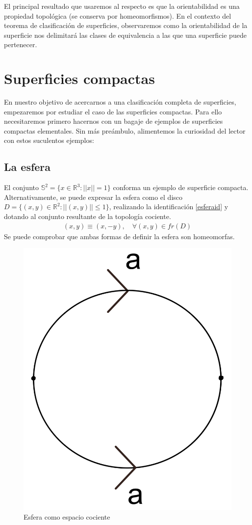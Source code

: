 \documentclass[a4paper,11pt,spanish, twoside, leqno]{tfg-uam}
\theoremstyle{definition}
\begin{document}
El principal resultado que usaremos al respecto es que la orientabilidad es una propiedad topológica (se conserva por homeomorfismos). En el contexto del teorema de clasificación de superficies, observaremos como la orientabilidad de la superficie nos delimitará las clases de equivalencia a las que una superficie puede pertenecer.

\section{Superficies compactas}

En nuestro objetivo de acercarnos a una clasificación  completa de superficies, empezaremos por estudiar el caso de las superficies compactas. Para ello necesitaremos primero hacernos con un bagaje de ejemplos de superficies compactas elementales. Sin más preámbulo, alimentemos la curiosidad del lector con estos suculentos ejemplos:

\subsection*{La esfera}
El conjunto $ \mathbb{S}^2 = \{x\in \mathbb{R}^3: ||x||=1 \} $ conforma un ejemplo de superficie compacta. Alternativamente, se puede expresar la esfera como el disco $ D = \{(x,y)\in\mathbb{R}^2: ||(x,y)||\leq1 \} $, realizando la identificación  \ref{esferaid} y dotando al conjunto resultante de la topología cociente.
\begin{align}\label{esferaid}
	(x,y)\equiv(x,-y),\quad\forall(x,y)\in fr(D)
\end{align}
Se puede comprobar que ambas formas de definir la esfera son homeomorfas. 

\begin{figure}[h!]
	\centering
	\includegraphics[width=0.15\linewidth]{imagenes/esfera_plana.png}
	\caption{Esfera como espacio cociente}
	\label{fig:esfera expresion canonica}
\end{figure} 
\end{document}
